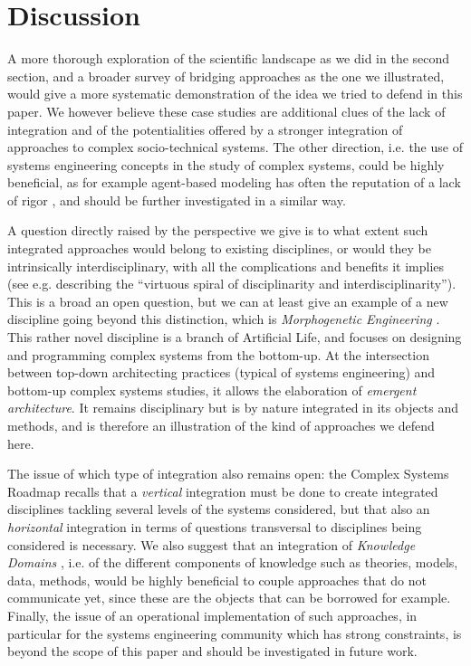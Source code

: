 \documentclass[runningheads,a4paper]{llncs}
\begin{document}
\section{Discussion}


A more thorough exploration of the scientific landscape as we did in the second section, and a broader survey of bridging approaches as the one we illustrated, would give a more systematic demonstration of the idea we tried to defend in this paper. We however believe these case studies are additional clues of the lack of integration and of the potentialities offered by a stronger integration of approaches to complex socio-technical systems. The other direction, i.e. the use of systems engineering concepts in the study of complex systems, could be highly beneficial, as for example agent-based modeling has often the reputation of a lack of rigor \cite{rand2011agent}, and should be further investigated in a similar way.

A question directly raised by the perspective we give is to what extent such integrated approaches would belong to existing disciplines, or would they be intrinsically interdisciplinary, with all the complications and benefits it implies (see e.g. \cite{banos2013pour} describing the ``virtuous spiral of disciplinarity and interdisciplinarity''). This is a broad an open question, but we can at least give an example of a new discipline going beyond this distinction, which is \emph{Morphogenetic Engineering} \cite{doursat2012morphogenetic}. This rather novel discipline is a branch of Artificial Life, and focuses on designing and programming complex systems from the bottom-up. At the intersection between top-down architecting practices (typical of systems engineering) and bottom-up complex systems studies, it allows the elaboration of \emph{emergent architecture}. It remains disciplinary but is by nature integrated in its objects and methods, and is therefore an illustration of the kind of approaches we defend here.

The issue of which type of integration also remains open: the Complex Systems Roadmap \cite{2009arXiv0907.2221B} recalls that a \emph{vertical} integration must be done to create integrated disciplines tackling several levels of the systems considered, but that also an \emph{horizontal} integration in terms of questions transversal to disciplines being considered is necessary. We also suggest that an integration of \emph{Knowledge Domains} \cite{raimbault2017applied}, i.e. of the different components of knowledge such as theories, models, data, methods, would be highly beneficial to couple approaches that do not communicate yet, since these are the objects that can be borrowed for example. Finally, the issue of an operational implementation of such approaches, in particular for the systems engineering community which has strong constraints, is beyond the scope of this paper and should be investigated in future work.
\end{document}
